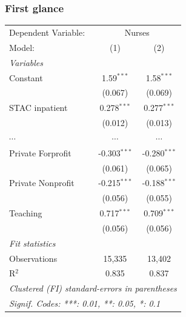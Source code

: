 \documentclass[10pt,mathserif]{beamer}
\begin{document}
\begin{frame}
  \frametitle{First glance}
  \begin{table}
    \fontsize{8pt}{8pt}\selectfont
    \begingroup
    \centering
    \begin{tabular}{lcc}
      \tabularnewline \midrule \midrule
      Dependent Variable: & \multicolumn{2}{c}{Nurses}                         \\
      Model:              & (1)                        & (2)                   \\
      \midrule
      \emph{Variables}                                                         \\
      Constant            & 1.59$^{***}$               & 1.58$^{***}$          \\
                          & (0.067)                    & (0.069)               \\
      STAC inpatient      & 0.278$^{***}$              & 0.277$^{***}$         \\
                          & (0.012)                    & (0.013)               \\
      $\cdots$            & $\cdots$                   & $\cdots$              \\
      Private Forprofit   & -0.303$^{***}$             & -0.280$^{***}$        \\
                          & (0.061)                    & (0.065)               \\
      Private Nonprofit   & -0.215$^{***}$             & -0.188$^{***}$        \\
                          & (0.056)                    & (0.055)               \\
      Teaching            & 0.717$^{***}$              & 0.709$^{***}$         \\
                          & (0.056)                    & (0.056)               \\
      \midrule
      \emph{Fit statistics}                                                    \\
      Observations        & 15,335                     & 13,402                \\
      R$^2$               & 0.835                      & 0.837                 \\
      \midrule \midrule
      \multicolumn{3}{l}{\emph{Clustered (FI) standard-errors in parentheses}} \\
      \multicolumn{3}{l}{\emph{Signif. Codes: ***: 0.01, **: 0.05, *: 0.1}}    \\
    \end{tabular}
    \par\endgroup
  \end{table}
\end{frame}
\end{document}
